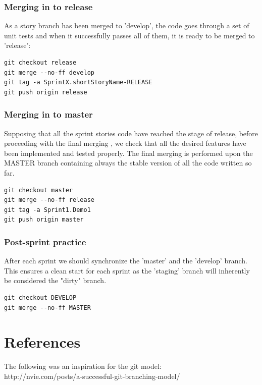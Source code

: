 \documentclass[11pt]{report}
\begin{document}
\subsection{Merging in to release}
As a story branch has been merged to 'develop', the code goes through a set of unit tests and when it successfully passes all of them, it is ready to be merged to 'release': 
\begin{verbatim}
git checkout release
git merge --no-ff develop
git tag -a SprintX.shortStoryName-RELEASE
git push origin release
\end{verbatim}
\subsection{Merging in to master}
Supposing that all the sprint stories code have reached the stage of release, before proceeding with the final merging , we check that all the desired features have been implemented and tested properly.
The final merging is performed upon the MASTER branch containing always the stable version of all the code written so far.
  \begin{verbatim}
git checkout master
git merge --no-ff release
git tag -a Sprint1.Demo1
git push origin master
\end{verbatim}
\subsection{Post-sprint practice}

After each sprint we should synchronize the 'master' and the 'develop' branch. This ensures a clean start for each sprint as the 'staging' branch will inherently be considered the "dirty" branch. 

  \begin{verbatim}
git checkout DEVELOP
git merge --no-ff MASTER
\end{verbatim}

\chapter{References}
The following was an inspiration for the git model:\\

http://nvie.com/posts/a-successful-git-branching-model/
\end{document}
